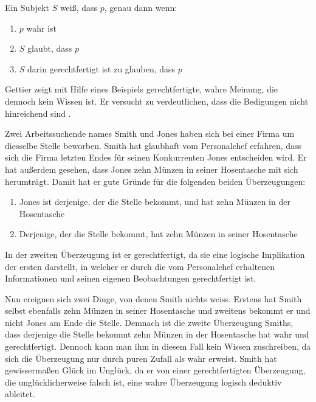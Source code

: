 \documentclass[a4paper]{article}
\begin{document}
\begin{center}
    Ein Subjekt $S$ weiß, dass $p$, genau dann wenn:
    \begin{enumerate}
        \item
            $p$ wahr ist
        \item
            $S$ glaubt, dass $p$
        \item
            $S$ darin gerechtfertigt ist zu glauben, dass $p$
    \end{enumerate}
\end{center}
Gettier zeigt mit Hilfe eines Beispiels gerechtfertigte, wahre Meinung, die dennoch kein Wissen ist. Er versucht zu verdeutlichen, dass die Bedigungen nicht hinreichend sind \cite{gettier}. 

Zwei Arbeitssuchende names Smith und Jones haben sich bei einer Firma um diesselbe Stelle beworben. Smith hat glaubhaft vom Personalchef erfahren, dass sich die Firma letzten Endes für seinen Konkurrenten Jones entscheiden wird. Er hat außerdem gesehen, dass Jones zehn Münzen in seiner Hosentasche mit sich herumträgt. Damit hat er gute Gründe für die folgenden beiden Überzeugungen:
\begin{enumerate}
    \item
        Jones ist derjenige, der die Stelle bekommt, und hat zehn Münzen in der Hosentasche
    \item
        Derjenige, der die Stelle bekommt, hat zehn Münzen in seiner Hosentasche
\end{enumerate}
In der zweiten Überzeugung ist er gerechtfertigt, da sie eine logische Implikation der ersten darstellt, in welcher er durch die vom Personalchef erhaltenen Informationen und seinen eigenen Beobachtungen gerechtfertigt ist.

Nun ereignen sich zwei Dinge, von denen Smith nichts weiss. Erstens hat Smith selbst ebenfalls zehn Münzen in seiner Hosentasche und zweitens bekommt er und nicht Jones am Ende die Stelle. Demnach ist die zweite Überzeugung Smiths, dass derjenige die Stelle bekommt zehn Münzen in der Hosentasche hat wahr und gerechtfertigt. Dennoch kann man ihm in diesem Fall kein Wissen zuschreiben, da sich die Überzeugung nur durch puren Zufall als wahr erweist. Smith hat gewissermaßen Glück im Unglück, da er von einer gerechtfertigten Überzeugung, die unglücklicherweise falsch ist, eine wahre Überzeugung logisch deduktiv ableitet.
\end{document}
